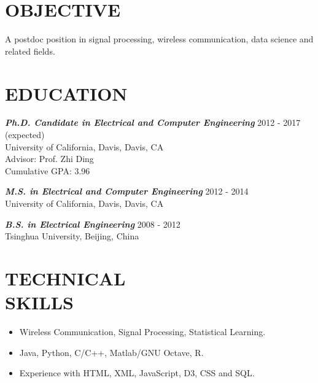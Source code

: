 \documentclass[margin]{res} %
\begin{document}
    \begin{resume}

     
        \section{OBJECTIVE}  
        A postdoc position in signal processing, wireless communication,
        data science and related fields.
    
    
        \section{EDUCATION}
    
        {\sl \bf Ph.D. Candidate in Electrical and Computer Engineering} \hfill
        2012 - 2017 (expected) \\
        University of California, Davis, Davis, CA \\
        Advisor: Prof. Zhi Ding \\
        Cumulative GPA: 3.96
        
        {\sl \bf M.S. in Electrical and Computer Engineering}  \hfill 2012 -
        2014\\
        University of California, Davis, Davis, CA
        
        {\sl \bf B.S. in Electrical Engineering}  \hfill 2008 - 2012\\
        Tsinghua University, Beijing, China
       
        \section{TECHNICAL \\ SKILLS}
        
        \begin{itemize}[leftmargin=*]
            \item Wireless Communication, Signal Processing, Statistical
            Learning.
            \item Java, Python, C/C++, Matlab/GNU Octave, R.
            \item Experience with HTML, XML, JavaScript, D3, CSS and SQL.
        \end{itemize} 
        

\end{resume}
\end{document}
